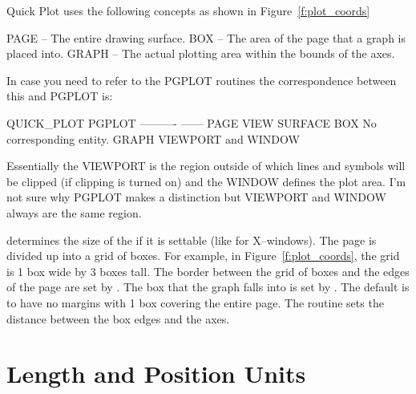 Quick Plot uses the following concepts as shown in Figure~\ref{f:plot_coords}
\begin{example}
  PAGE  -- The entire drawing surface.
  BOX   -- The area of the page that a graph is placed into.
  GRAPH -- The actual plotting area within the bounds of the axes.
\end{example}
In case you need to refer to the PGPLOT routines the correspondence between this and PGPLOT is:
\begin{example}
  QUICK_PLOT    PGPLOT
  ----------    ------
  PAGE          VIEW SURFACE
  BOX           No corresponding entity.
  GRAPH         VIEWPORT and WINDOW
\end{example}
Essentially the VIEWPORT is the region outside of which lines and symbols
will be clipped (if clipping is turned on) and the WINDOW defines the
plot area. I'm not sure why PGPLOT makes a distinction but VIEWPORT and
WINDOW always are the same region.

 determines the size of the  if it is settable (like for
X--windows). The page is divided up into a grid of boxes. For example, 
in Figure~\ref{f:plot_coords}, the grid is 1 box wide by 3 boxes tall. The border
between the grid of boxes and the edges of the page are set by .
The box that the graph falls into is set by . The default is to
have no margins with 1 box covering the entire page. The  routine
sets the distance between the box edges and the axes.


\section{Length and Position Units}
\label{s:plot_units}

